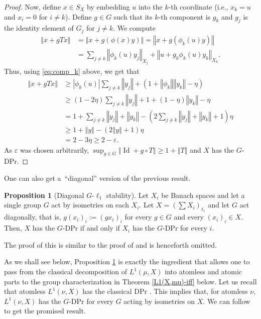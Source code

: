 \documentclass[a4paper,12pt]{amsart}
\theoremstyle{definition}
\newtheorem{proposition}[theorem]{Proposition}
\theoremstyle{definition}
\theoremstyle{remark}
\numberwithin{equation}{section}
\DeclareMathOperator{\id}{Id}
\newcommand{\<}{\langle}
\renewcommand{\>}{\rangle}
\newcommand{\norm}[1]{\left\Vert#1\right\Vert}
\newcommand{\e}{\varepsilon}
\newcommand{\eps}{\e}
\begin{document}
\begin{proof}
		Now, define $x \in S_X$ by embedding $u$ into the $k$-th coordinate (i.e., $x_k=u$ and $x_i=0$ for $i \neq k$). Define $g \in G$ such that its $k$-th component is $g_k$ and $g_j$ is the identity element of $G_j$ for $j \neq k$. We compute
		\begin{align*}
			\norm{x + gTx}
			&= \norm{x + g(\phi(x)y)} 
			= \norm{x + g(\phi_k(u)y)} \\
			&= \sum_{j \neq k} \norm{\phi_k(u) y_j}_{X_j} + \norm{u + g_k \phi_k(u) y_k}_{X_k}.
		\end{align*}
		Thus, using \eqref{eq:comp_k} above, we get that
		\begin{align*}
			\norm{x + gTx} 
			&\ge |\phi_k(u)| \sum_{j \neq k} \norm{y_j} + (1 + \norm{\phi_k}\norm{y_k} - \eta)\\
			&\ge (1-2\eta) \sum_{j \neq k} \norm{y_j} + 1 + (1-\eta)\norm{y_k} - \eta\\
			&= 1 + \sum_{j \neq k} \norm{y_j} + \norm{y_k}
			- \left(2\sum_{j \neq k} \norm{y_j} + \norm{y_k} + 1\right)\eta\\
			&\ge 1 + \norm{y} - (2\norm{y} + 1) \eta\\
			&= 2 - 3\eta \ge 2-\eps.
		\end{align*}
		As $\e$ was chosen arbitrarily, $\sup_{g \in G} \norm{\id + g \circ T} \ge 1 + \norm{T}$ and $X$ has the $G$-DPr.
	\end{proof}
	
	One can also get a~``diagonal'' version of the previous result.
	\begin{proposition}[Diagonal $G$-$\ell_1$ stability] \label{prop:diagonal-ell1-stability}
		Let $X_i$ be Banach spaces and let a single group $G$ act by isometries on each $X_i$. Let $X = \left( \sum X_i \right)_{\ell_1}$ and let $G$ act diagonally, that is, $g(x_i)_i := (g x_i)_i$ for every $g \in G$ and every $(x_i)_i \in X$. Then, $X$ has the $G$-DPr if and only if $X_i$ has the $G$-DPr for every $i$.
	\end{proposition}
	The proof of this is similar to the proof of  and is henceforth omitted.
	
	As we shall see below, Proposition \ref{prop:diagonal-ell1-stability} is exactly the ingredient that allows one to pass from the classical decomposition of $L^1(\mu,X)$ into atomless and atomic parts to the group characterization in Theorem \ref{L1(X,mu)-iff} below. Let us recall that atomless $L^1(\nu, X)$ has the classical DPr \cite{Kadets2000}. This implies that, for atomless $\nu$, $L^1(\nu, X)$ has the $G$-DPr for every $G$ acting by isometries on $X$.
	We can follow \cite[Remark 9]{MartinPaya2000} to get the promised result.
	
\end{document}

